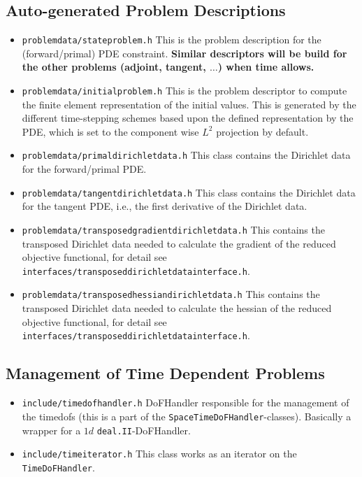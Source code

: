 \subsection{Auto-generated Problem Descriptions}
\begin{itemize}
  \item \texttt{problemdata/stateproblem.h} This is the problem description for the (forward/primal) PDE constraint.
    \textbf{Similar descriptors will be build for the other problems (adjoint, tangent, $\ldots$) when time allows.}
  \item \texttt{problemdata/initialproblem.h} This is the problem descriptor to compute the finite element representation
    of the initial values. This is generated by the different time-stepping schemes based upon the defined 
    representation by the PDE, which is set to the component wise $L^2$ projection by default.
  \item \texttt{problemdata/primaldirichletdata.h} This class contains the Dirichlet data for the 
    forward/primal PDE.
  \item \texttt{problemdata/tangentdirichletdata.h} This class contains the Dirichlet data for the tangent PDE, i.e.,
    the first derivative of the Dirichlet data.
  \item \texttt{problemdata/transposedgradientdirichletdata.h} This contains the transposed Dirichlet data needed 
    to calculate the gradient of the reduced objective functional, 
    for detail see \texttt{interfaces/transposeddirichletdatainterface.h}.
  \item \texttt{problemdata/transposedhessiandirichletdata.h} This contains the transposed Dirichlet data needed 
    to calculate the hessian of the reduced objective functional, 
    for detail see \texttt{interfaces/transposeddirichletdatainterface.h}.
\end{itemize}
\subsection{Management of Time Dependent Problems}
\begin{itemize}
\item \texttt{include/timedofhandler.h} DoFHandler responsible for the management of the timedofs (this is a part of the \texttt{SpaceTimeDoFHandler}-classes). Basically a wrapper for a $1d$ \texttt{deal.II}-DoFHandler.
\item \texttt{include/timeiterator.h} This class works as an iterator on the \texttt{TimeDoFHandler}.                 
\end{itemize}
